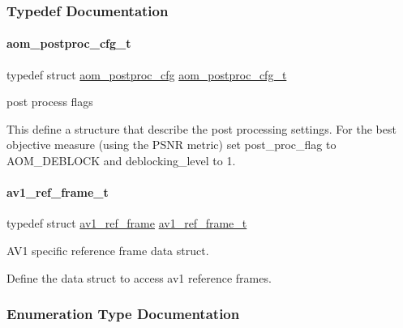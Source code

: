 \subsubsection{Typedef Documentation}
\mbox{\label{group__aom_gaf8a9b796d86228c9badeee6f13e5196b}} 
\paragraph{\texorpdfstring{aom\+\_\+postproc\+\_\+cfg\+\_\+t}{aom\_postproc\_cfg\_t}}
{\footnotesize\ttfamily typedef struct \hyperlink{structaom__postproc__cfg}{aom\+\_\+postproc\+\_\+cfg}  \hyperlink{group__aom_gaf8a9b796d86228c9badeee6f13e5196b}{aom\+\_\+postproc\+\_\+cfg\+\_\+t}}



post process flags 

This define a structure that describe the post processing settings. For the best objective measure (using the P\+S\+NR metric) set post\+\_\+proc\+\_\+flag to A\+O\+M\+\_\+\+D\+E\+B\+L\+O\+CK and deblocking\+\_\+level to 1. \mbox{\label{group__aom_ga8de31c9dd61cb25763c30066885fc9b6}} 
\paragraph{\texorpdfstring{av1\+\_\+ref\+\_\+frame\+\_\+t}{av1\_ref\_frame\_t}}
{\footnotesize\ttfamily typedef struct \hyperlink{structav1__ref__frame}{av1\+\_\+ref\+\_\+frame}  \hyperlink{group__aom_ga8de31c9dd61cb25763c30066885fc9b6}{av1\+\_\+ref\+\_\+frame\+\_\+t}}



A\+V1 specific reference frame data struct. 

Define the data struct to access av1 reference frames. 

\subsubsection{Enumeration Type Documentation}
\mbox{\label{group__aom_ga9421a1fa78c0d9587ae5aa6c1cb3d659}} 
